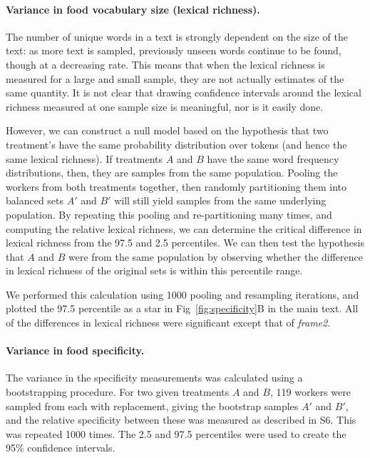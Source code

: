 \documentclass[12pt]{article}
\begin{document}
	\paragraph{Variance in food vocabulary size (lexical richness).}
	The number of unique words in a text is strongly dependent on the size
	of the text: as more text is sampled, previously unseen words continue
	to be found, though at a decreasing rate.  This means that when the 
	lexical richness is measured for a large and small sample, they are not 
	actually estimates of the same quantity.  It is not clear that drawing 
	confidence intervals around the lexical richness measured at one sample 
	size is meaningful, nor is it easily done.

	However, we can construct a null model based on the hypothesis that
	two treatment's have the same probability distribution over tokens
	(and hence the same lexical richness). If treatments $A$ and $B$ have
	the same word frequency distributions, then, they are samples from
	the same population.  Pooling the workers from both treatments together,
	then randomly partitioning them into balanced sets $A'$ and $B'$ will
	still yield samples from the same underlying population.  By repeating 
	this pooling and re-partitioning many times, and computing the 
	relative lexical richness, we can determine the critical difference in
	lexical richness from the 97.5 and 2.5 percentiles.  We can then test 
	the hypothesis that $A$ and $B$ were from the same population by 
	observing whether the difference in lexical richness of the original 
	sets is within this percentile range.
	
	We performed this calculation using 1000 pooling and resampling 
	iterations, and plotted the 97.5 percentile as a star in 
	Fig~\ref{fig:specificity}B in the main text.  All of the differences
	in lexical richness were significant except that of \textit{frame2}.

	\paragraph{Variance in food specificity.}
	The variance in the specificity measurements was calculated using a 
	bootstrapping procedure.  For two given treatments $A$ and $B$, 
	119 workers were sampled from each with replacement, giving the bootstrap
	samples $A'$ and $B'$, and the relative specificity between these 
	was measured as described in \textsection S6.
	This was repeated 1000 times.  The 2.5 and 97.5 percentiles were used
	to create the 95\% confidence intervals.
\end{document}
